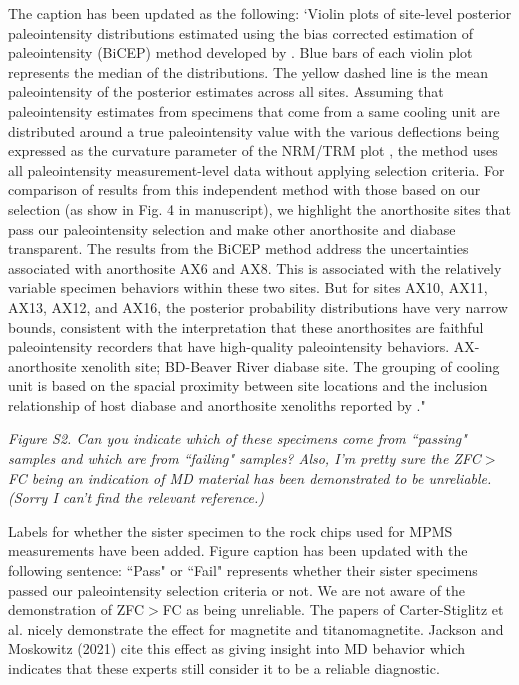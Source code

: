 \documentclass[11pt, letterpaper]{article}
\begin{document}
\begin{flushleft}
The caption has been updated as the following: `Violin plots of site-level posterior paleointensity distributions estimated using the bias corrected estimation of paleointensity (BiCEP) method developed by \citealp{Cych2021a}. Blue bars of each violin plot represents the median of the distributions. The yellow dashed line is the mean paleointensity of the posterior estimates across all sites. Assuming that paleointensity estimates from specimens that come from a same cooling unit are distributed around a true paleointensity value with the various deflections being expressed as the curvature parameter of the NRM/TRM plot \cite{Arai1963a, Paterson2011a}, the method uses all paleointensity measurement-level data without applying selection criteria. For comparison of results from this independent method with those based on our selection (as show in Fig. 4 in manuscript), we highlight the anorthosite sites that pass our paleointensity selection and make other anorthosite and diabase transparent. The results from the BiCEP method address the uncertainties associated with anorthosite AX6 and AX8. This is associated with the relatively variable specimen behaviors within these two sites. But for sites AX10, AX11, AX13, AX12, and AX16, the posterior probability distributions have very narrow bounds, consistent with the interpretation that these anorthosites are faithful paleointensity recorders that have high-quality paleointensity behaviors. AX-anorthosite xenolith site; BD-Beaver River diabase site. The grouping of cooling unit is based on the spacial proximity between site locations and the inclusion relationship of host diabase and anorthosite xenoliths reported by \citealp{Zhang2021b}."

\textit{Figure S2. Can you indicate which of these specimens come from ``passing" samples and which are from ``failing" samples? Also, I'm pretty sure the ZFC$>$FC being an indication of MD material has been demonstrated to be unreliable. (Sorry I can't find the relevant reference.)}

Labels for whether the sister specimen to the rock chips used for MPMS measurements have been added. Figure caption has been updated with the following sentence: ``Pass" or ``Fail" represents whether their sister specimens passed our paleointensity selection criteria or not. We are not aware of the demonstration of ZFC$>$FC as being unreliable. The papers of Carter-Stiglitz et al. nicely demonstrate the effect for magnetite and titanomagnetite. Jackson and Moskowitz (2021) cite this effect as giving insight into MD behavior which indicates that these experts still consider it to be a reliable diagnostic.  


\end{flushleft}
\end{document}
